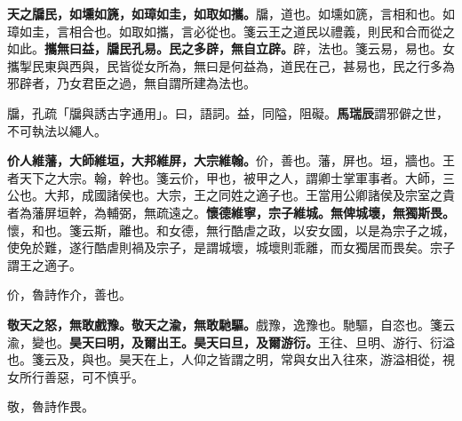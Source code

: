 \textbf{天之牖民，如壎如篪，如璋如圭，如取如攜。}{\footnotesize 牖，道也。如壎如篪，言相和也。如璋如圭，言相合也。如取如攜，言必從也。箋云王之道民以禮義，則民和合而從之如此。}\textbf{攜無曰益，牖民孔易。民之多辟，無自立辟。}{\footnotesize 辟，法也。箋云易，易也。女攜掣民東與西與，民皆從女所為，無曰是何益為，道民在己，甚易也，民之行多為邪辟者，乃女君臣之過，無自謂所建為法也。}

\begin{quoting}牖，孔疏「牖與誘古字通用」。曰，語詞。益，同隘，阻礙。\textbf{馬瑞辰}謂邪僻之世，不可執法以繩人。\end{quoting}

\textbf{价人維藩，大師維垣，大邦維屏，大宗維翰。}{\footnotesize 价，善也。藩，屏也。垣，牆也。王者天下之大宗。翰，幹也。箋云价，甲也，被甲之人，謂卿士掌軍事者。大師，三公也。大邦，成國諸侯也。大宗，王之同姓之適子也。王當用公卿諸侯及宗室之貴者為藩屏垣幹，為輔弼，無疏遠之。}\textbf{懷德維寧，宗子維城。無俾城壞，無獨斯畏。}{\footnotesize 懷，和也。箋云斯，離也。和女德，無行酷虐之政，以安女國，以是為宗子之城，使免於難，遂行酷虐則禍及宗子，是謂城壞，城壞則乖離，而女獨居而畏矣。宗子謂王之適子。}

\begin{quoting}价，魯詩作介，善也。\end{quoting}

\textbf{敬天之怒，無敢戲豫。敬天之渝，無敢馳驅。}{\footnotesize 戲豫，逸豫也。馳驅，自恣也。箋云渝，變也。}\textbf{昊天曰明，及爾出王。昊天曰旦，及爾游衍。}{\footnotesize 王往、旦明、游行、衍溢也。箋云及，與也。昊天在上，人仰之皆謂之明，常與女出入往來，游溢相從，視女所行善惡，可不慎乎。}

\begin{quoting}敬，魯詩作畏。\end{quoting}

